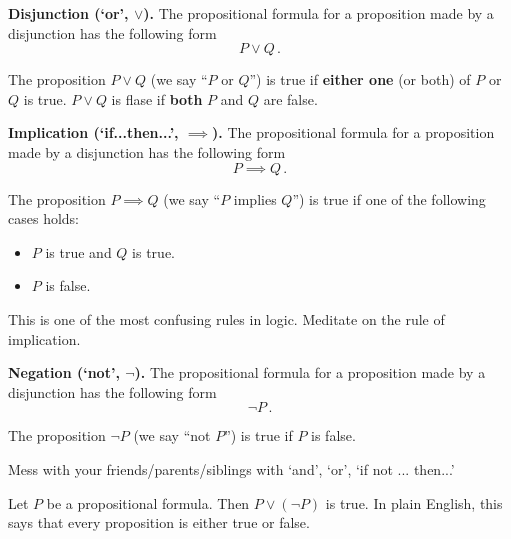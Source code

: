 {\bf Disjunction (`or', $\vee$).}
 The propositional formula for a proposition made by a disjunction has the following form
\begin{equation*}
    P \vee Q \,.
\end{equation*}
\begin{rule*}
    The proposition $P \vee Q$ (we say ``$P$ or $Q$'') is true if { \bf either one} 
    (or both) of $P$ or $Q$ is true.
    $P \vee Q$ is flase if {\bf both} $P$ and $Q$ are false.
\end{rule*}

{\bf Implication (`if...then...', $\implies$).}
 The propositional formula for a proposition made by a disjunction has the following form
\begin{equation*}
    P \implies Q \,.
\end{equation*}
\begin{rule*}
    The proposition $P\implies Q$ (we say ``$P$ implies $Q$'') is true if one of
    the following cases holds:
    \begin{itemize}
        \item $P$ is true and $Q$ is true.
        \item $P$ is false.
    \end{itemize}
\end{rule*}

\begin{exercise}
   This is one of the most confusing rules in logic. 
   Meditate on the rule of implication. 
\end{exercise}


{\bf Negation (`not', $\neg$).}
 The propositional formula for a proposition made by a disjunction has the following form
\begin{equation*}
    \neg P \,.
\end{equation*}
\begin{rule*}
    The proposition $\neg P$ (we say ``not $P$'') is true if $P$ is false.
\end{rule*}



\begin{exercise}
    Mess with your friends/parents/siblings with `and', `or', `if not ... then...'
\end{exercise}

\begin{axiom}
   Let $P$ be a propositional formula. 
        Then $P \vee (\neg P)$ is true.
        In plain English, this says that every proposition is either true or false.
\end{axiom}

